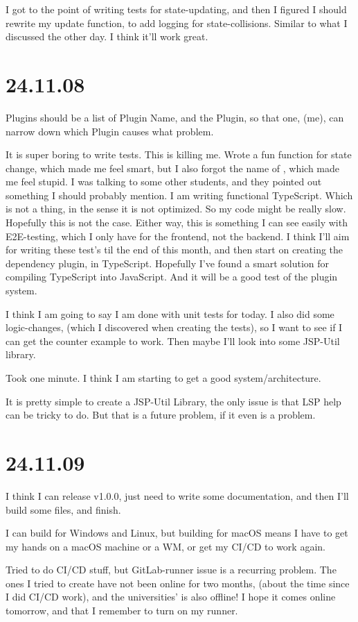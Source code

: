 I got to the point of writing tests for state-updating, and then I figured I
should rewrite my update function, to add logging for state-collisions. Similar
to what I discussed the other day. I think it'll work great.


\section{24.11.08}

Plugins should be a list of Plugin Name, and the Plugin, so that one, (me), can
narrow down which Plugin causes what problem.

It is super boring to write tests. This is killing me. Wrote a fun function
for state change, which made me feel smart, but I also forgot the name of
, which made me feel stupid. I was talking to some other students,
and they pointed out something I should probably mention. I am writing
functional TypeScript. Which is not a thing, in the sense it is not optimized.
So my code might be really slow. Hopefully this is not the case. Either way,
this is something I can see easily with E2E-testing, which I only have for the
frontend, not the backend. I think I'll aim for writing these test's til the end
of this month, and then start on creating the dependency plugin, in TypeScript.
Hopefully I've found a smart solution for compiling TypeScript into JavaScript.
And it will be a good test of the plugin system.

I think I am going to say I am done with unit tests for today. I also did some
logic-changes, (which I discovered when creating the tests), so I want to see
if I can get the counter example to work. Then maybe I'll look into some
JSP-Util library.

Took one minute. I think I am starting to get a good system/architecture.

It is pretty simple to create a JSP-Util Library, the only issue is that LSP
help can be tricky to do. But that is a future problem, if it even is a
problem.


\section{24.11.09}

I think I can release v1.0.0, just need to write some documentation, and then
I'll build some files, and finish.

I can build for Windows and Linux, but building for macOS means I have to get
my hands on a macOS machine or a WM, or get my CI/CD to work again.

Tried to do CI/CD stuff, but GitLab-runner issue is a recurring problem. The
ones I tried to create have not been online for two months, (about the time
since I did CI/CD work), and the universities' is also offline! I hope it comes
online tomorrow, and that I remember to turn on my runner.
